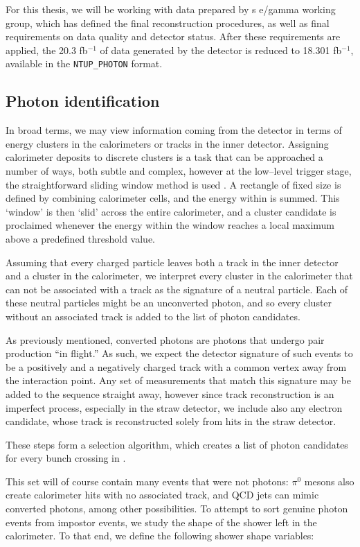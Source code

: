 For this thesis, we will be working with data prepared by \atlas{}s e/gamma working group, which has defined the final reconstruction procedures, as well as final requirements on data quality and detector status. After these requirements are applied, the 20.3 fb$^{-1}$ of data generated by the \atlas{} detector is reduced to 18.301 fb$^{-1}$, available in the \texttt{NTUP_PHOTON} format.


\subsection{Photon identification}
In broad terms, we may view information coming from the detector in terms of energy clusters in the calorimeters or tracks in the inner detector. Assigning calorimeter deposits to discrete clusters is a task that can be approached a number of ways, both subtle and complex, however at the low--level trigger stage, the straightforward sliding window method is used \cite{atlascluster:sw}. A rectangle of fixed size is defined by combining calorimeter cells, and the energy within is summed. This `window' is then `slid' across the entire calorimeter, and a cluster candidate is proclaimed whenever the energy within the window reaches a local maximum above a predefined threshold value.

Assuming that every charged particle leaves both a track in the inner detector and a cluster in the calorimeter, we interpret every cluster in the calorimeter that can not be associated with a track as the signature of a neutral particle. Each of these neutral particles might be an unconverted photon, and so every cluster without an associated track is added to the list of photon candidates.

As previously mentioned, converted photons are photons that undergo pair production ``in flight.'' As such, we expect the detector signature of such events to be a positively and a negatively charged track with a common vertex away from the interaction point. Any set of measurements that match this signature may be added to the sequence straight away, however since track reconstruction is an imperfect process, especially in the straw detector, we include also any electron candidate, whose track is reconstructed solely from hits in the straw detector.

These steps form a selection algorithm, which creates a list of photon candidates for every bunch crossing in \atlas{} \cite{phorec}.

This set will of course contain many events that were not photons: $\pi^0$ mesons also create calorimeter hits with no associated track, and QCD jets can mimic converted photons, among other possibilities. To attempt to sort genuine photon events from impostor events, we study the shape of the shower left in the calorimeter. To that end, we define the following shower shape variables:

